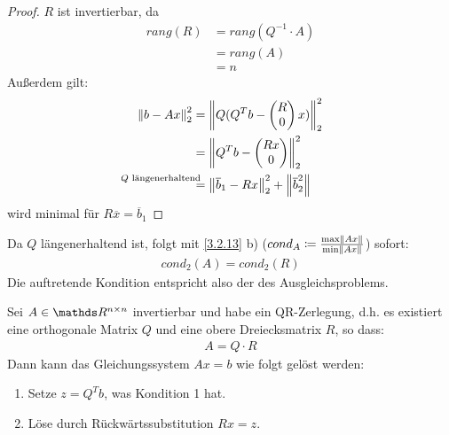 \begin{proof} $R$ ist invertierbar, da 
  \begin{align*}
    rang(R) &= rang(Q^{-1}\cdot A) \\	
            & = rang(A) \\
            &= n
  \end{align*}
  Außerdem gilt:
  \begin{align*}
    \nn{b-Ax}_2^2 & = \nn{Q(Q^Tb-\begin{pmatrix}R\\0\end{pmatrix}x)}_2^2 \\
                  &=  \nn{Q^Tb-\begin{pmatrix}Rx\\0\end{pmatrix}}_2^2  \\
                  &\overset{\mathllap{\text{$Q$ längenerhaltend}}}{=}
                    \nn{\overline{b}_1 - Rx}_2^2  + \nn{\overline{b}_2^2}
  \end{align*}
  wird minimal für $R\overline{x} = \overline{b}_1$
\end{proof}

Da $Q$ längenerhaltend ist, folgt mit \ref{3.2.13} b)
($cond_A \coloneqq \frac{\max \left\| Ax \right\|}{\min \left\| Ax \right\|}$)
sofort:
\begin{gather*}
  cond_2(A) = cond_2(R)
\end{gather*}
Die auftretende Kondition entspricht also der des Ausgleichsproblems.


\begin{Beme}
  Sei $A\in \Renn$ invertierbar und habe ein QR-Zerlegung, d.h. es existiert
  eine orthogonale Matrix $Q$ und eine obere Dreiecksmatrix $R$, so dass:
  \begin{gather*}
    A= Q\cdot R
  \end{gather*}
  Dann kann das Gleichungssystem $Ax=b$ wie folgt gelöst werden:
  \begin{enumerate}[1.]
  \item Setze $z=Q^Tb$, was Kondition 1 hat.
  \item Löse durch Rückwärtssubstitution $Rx=z$.
  \end{enumerate}
\end{Beme}



